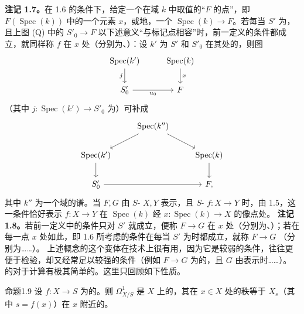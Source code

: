 \textbf{注记 1.7。}在 1.6 的条件下，给定一个在域 $k$ 中取值的“$F$ 的点”，即 $F(\operatorname{Spec}(k))$ 中的一个元素 $x$，或地，一个 $\operatorname{Spec}(k)\to F$。若每当 $S'$ 为，且上图 (Q) 中的 $S'_0\to F$ 以下述意义“与标记点相容”时，前一定义的条件都成立，就同样称 $f$ 在 $x$ 处（分别为、）：设 $k'$ 为 $S'$ 和 $S'_0$ 在其处的，则图
\[\begin{tikzcd}\operatorname{Spec}(k')\arrow[d,"j"']&\operatorname{Spec}(k)\arrow[d,"x"]\\S'_0\arrow[r,"u_0"']&F\end{tikzcd}\]
（其中 $j:\operatorname{Spec}(k')\to S'_0$ 为）可补成
\[\begin{tikzcd}&\operatorname{Spec}(k'')\arrow[dl]\arrow[dr]&\\\operatorname{Spec}(k')\arrow[d]&&\operatorname{Spec}(k)\arrow[d]\\S'_0\arrow[rr]&&F,\end{tikzcd}\]
其中 $k''$ 为一个域的谱。当 $F,G$ 由 $S$- $X,Y$ 表示，且 $S$- $f:X\to Y$ 时，由 1.5，这一条件恰好表示 $f:X\to Y$ 在 $\operatorname{Spec}(k)$ 经 $x:\operatorname{Spec}(k)\to X$ 的像点处。
\textbf{注记 1.8。}若前一定义中的条件只对 $S'$ 就成立，便称 $F\to G$ 在 $x$ 处（分别为、）；若在每一点 $x$ 处如此，即 1.6 所考虑的条件在每当 $S'$ 为时都成立，就称 $F\to G$ （分别为……）。
上述概念的这个变体在技术上很有用，因为它是较弱的条件，往往更便于检验，却又经常足以较强的条件（例如 $F\to G$ 为的，且 $G$ 由表示时……）。
的对于计算有极其简单的。这里只回顾如下性质。
\begin{SGAresult}{命题}{1.9}
设 $f:X\to S$ 为的。则 $\Omega^1_{X/S}$ 是 $X$ 上的，其在 $x\in X$ 处的秩等于 $X_s$（其中 $s=f(x)$）在 $x$ 附近的。
\end{SGAresult}
